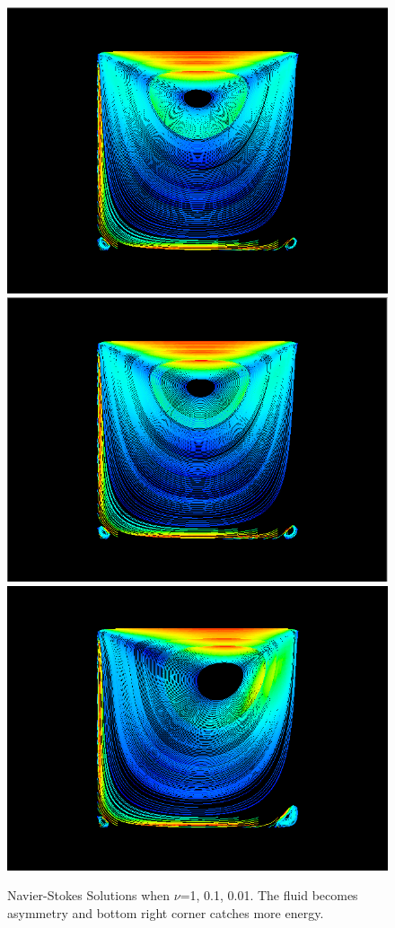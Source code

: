 \documentclass[a4paper]{article}
\begin{document}
\begin{figure}[h]
\centering
\includegraphics[scale = 0.2]{images/a.png}
\includegraphics[scale = 0.2]{images/b.png}
\includegraphics[scale = 0.2]{images/c.png}
\caption{Navier-Stokes Solutions when $\nu$=1, 0.1, 0.01. The fluid becomes asymmetry and bottom right corner catches more energy.}
\label{im::Navier-Stoke-solution}
\end{figure}
\end{document}
